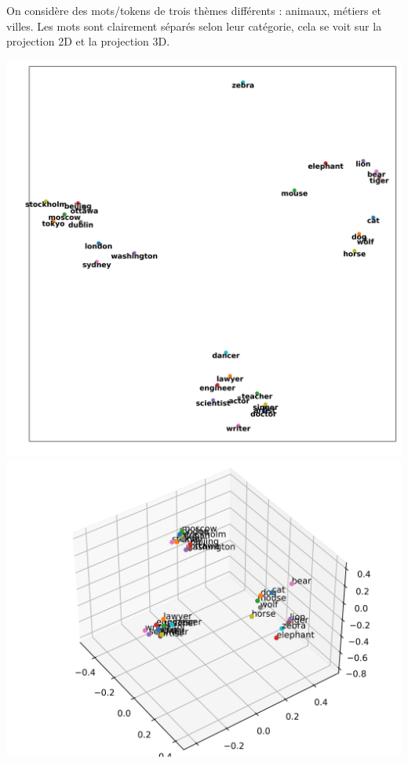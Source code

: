 \documentclass[11pt,class=report,crop=false]{standalone}
\begin{document}
\begin{exemple}
On considère des mots/tokens de trois thèmes différents : \og{}animaux\fg{}, \og{}métiers\fg{} et \og{}villes\fg{}. Les mots sont clairement séparés selon leur catégorie, cela se voit sur la projection 2D et la projection 3D.

\begin{center}
	\includegraphics[scale=\myscale,scale=0.3]{figures/projection-pca-2}
	\includegraphics[scale=\myscale,scale=0.5]{figures/projection-pca-3}
\end{center}
\end{exemple}
\end{document}
